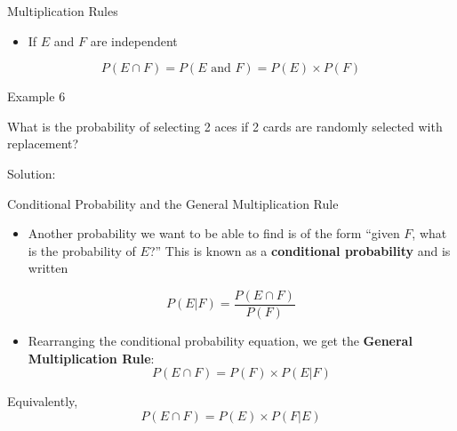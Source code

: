 \documentclass[
  ignorenonframetext,
]{beamer}
\providecommand{\tightlist}{%
  \setlength{\itemsep}{0pt}\setlength{\parskip}{0pt}}
\begin{document}
\begin{frame}{Multiplication Rules}
\protect\hypertarget{multiplication-rules}{}
\begin{itemize}
\tightlist
\item
  If \(E\) and \(F\) are independent
\end{itemize}

\[P(E \cap F) =P(E \text{ and } F)= P(E)\times P(F)\]
\end{frame}

\begin{frame}{Example 6}
\protect\hypertarget{example-6}{}
\begin{tcolorbox}
What is the probability of selecting 2 aces if 2 cards are randomly selected with replacement?
\end{tcolorbox}

\begin{tcolorbox}
Solution:


\vspace{30mm}


\end{tcolorbox}
\end{frame}

\begin{frame}{Conditional Probability and the General Multiplication
Rule}
\protect\hypertarget{conditional-probability-and-the-general-multiplication-rule}{}
\begin{itemize}
\tightlist
\item
  Another probability we want to be able to find is of the form ``given
  \(F\), what is the probability of \(E\)?'' This is known as a
  \textbf{conditional probability} and is written
\end{itemize}

\[P(E | F)=\frac{P( E \cap  F)}{P( F)}\]

\begin{itemize}
\tightlist
\item
  Rearranging the conditional probability equation, we get the
  \textbf{General Multiplication Rule}:
  \[P( E \cap  F)=P( F)\times P( E| F)\]
\end{itemize}

Equivalently, \[P(E \cap F)=P(E)\times P(F| E)\]
\end{frame}
\end{document}

